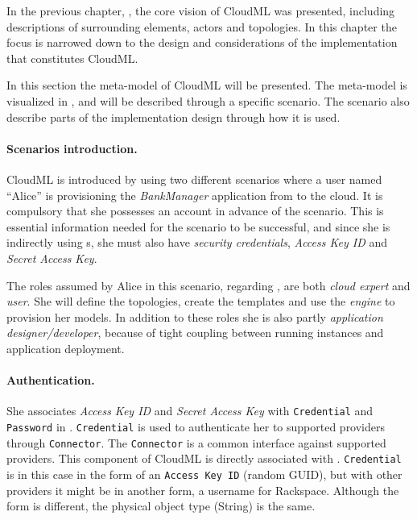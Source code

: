 
In the previous chapter, , the core vision of CloudML was presented,
including descriptions of surrounding elements, \eg actors and topologies.
In this chapter the focus is narrowed down to the design and considerations 
of the implementation that constitutes CloudML.



In this section the meta-model of CloudML will be presented.
The meta-model is visualized in ,
and will be described through a specific scenario.
The scenario also describe parts of the implementation design through how it is used.

\paragraph{Scenarios introduction.}

CloudML is introduced by using two different scenarios where a user named ``Alice'' is provisioning the 
\emph{BankManager} application from  to the  cloud.
It is compulsory that she possesses an  account in advance of the scenario.
This is essential information needed for the scenario to be successful,
and since she is indirectly using  s,
she must also have \emph{security credentials},
\ie \emph{Access Key ID} and \emph{Secret Access Key}.

The roles assumed by Alice in this scenario, regarding ,
are both \emph{cloud expert} and \emph{user}.
She will define the topologies, create the templates and use 
the \emph{engine} to provision her models.
In addition to these roles she is also partly \emph{application designer/developer},
because of tight coupling between running instances and application deployment.

\paragraph{Authentication.}

She associates \emph{Access Key ID} and \emph{Secret Access Key} with 
\texttt{Credential} and \texttt{Password} in .
\texttt{Credential} is used to authenticate her to supported providers through \texttt{Connector}.
The \texttt{Connector} is a common interface against supported providers.
This component of CloudML is directly associated with .
\texttt{Credential} is in this case in the form of an \texttt{Access Key ID} (random GUID),
but with other providers it might be in another form, \eg a username for Rackspace.
Although the form is different, the physical object type (String) is the same.

